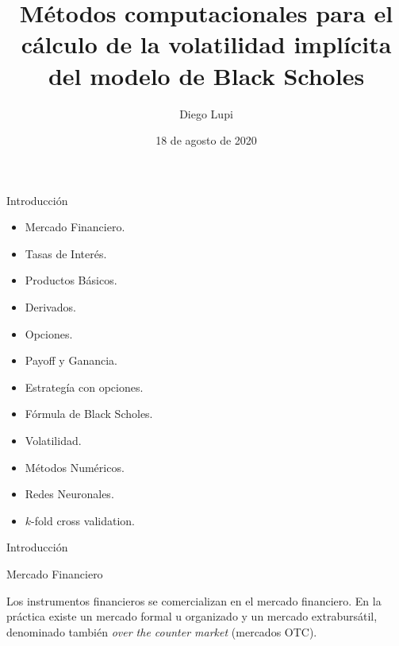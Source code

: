 \documentclass{beamer}
\title[]{M\'etodos computacionales para el c\'alculo de la volatilidad impl\'icita del modelo de Black Scholes}
\author[]{Diego Lupi}
\institute[]
{
  Universidad Nacional de C\'ordoba\\
  FaMAF
}
\date{18 de agosto de 2020}
\begin{document}
\frame{\titlepage}

\begin{frame}{Introducci\'on}

\begin{itemize}

    \item Mercado Financiero.
    
    \item Tasas de Inter\'es.

    \item Productos B\'asicos.
    
    \item Derivados.

    \item Opciones.

    \item Payoff y Ganancia.

    \item Estrateg\'ia con opciones.

    \item F\'ormula de Black Scholes.

    \item Volatilidad.

    \item M\'etodos Num\'ericos.

    \item Redes Neuronales.

    \item $k$-fold cross validation.


\end{itemize}
\end{frame}

\begin{frame}{Introducci\'on}

    \begin{block}{Mercado Financiero}

    Los instrumentos financieros se comercializan en el mercado financiero. En la pr\'actica existe
    un mercado formal u organizado y un mercado extraburs\'atil, denominado tambi\'en \textit{over the counter market} (mercados OTC).

    \end{block}

\end{frame}
\end{document}
